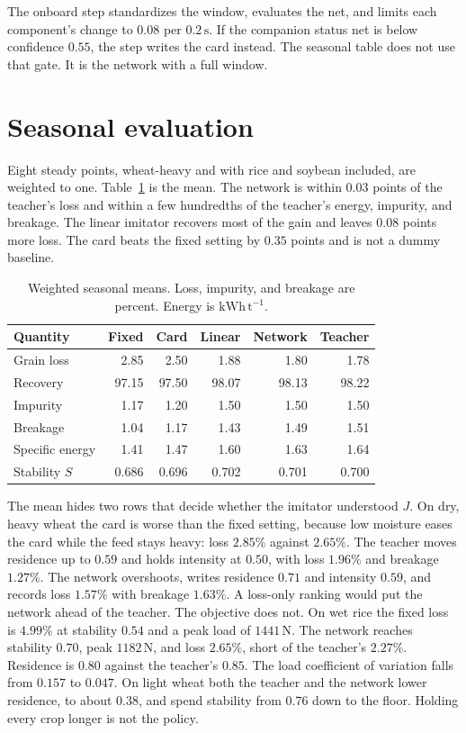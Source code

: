 \documentclass[11pt,a4paper]{article}
\begin{document}
The onboard step standardizes the window, evaluates the net, and limits each component's change to \(0.08\) per \(0.2\,\mathrm{s}\). If the companion status net is below confidence \(0.55\), the step writes the card instead. The seasonal table does not use that gate. It is the network with a full window.

\section{Seasonal evaluation}

Eight steady points, wheat-heavy and with rice and soybean included, are weighted to one. Table~\ref{tab:season} is the mean. The network is within \(0.03\) points of the teacher's loss and within a few hundredths of the teacher's energy, impurity, and breakage. The linear imitator recovers most of the gain and leaves \(0.08\) points more loss. The card beats the fixed setting by \(0.35\) points and is not a dummy baseline.

\begin{table}[ht]
\centering
\caption{Weighted seasonal means. Loss, impurity, and breakage are percent. Energy is \(\mathrm{kWh\,t^{-1}}\).}
\label{tab:season}
\begin{tabular}{@{}lrrrrr@{}}
\toprule
Quantity & Fixed & Card & Linear & Network & Teacher \\
\midrule
Grain loss & 2.85 & 2.50 & 1.88 & 1.80 & 1.78 \\
Recovery & 97.15 & 97.50 & 98.07 & 98.13 & 98.22 \\
Impurity & 1.17 & 1.20 & 1.50 & 1.50 & 1.50 \\
Breakage & 1.04 & 1.17 & 1.43 & 1.49 & 1.51 \\
Specific energy & 1.41 & 1.47 & 1.60 & 1.63 & 1.64 \\
Stability \(S\) & 0.686 & 0.696 & 0.702 & 0.701 & 0.700 \\
\bottomrule
\end{tabular}
\end{table}

The mean hides two rows that decide whether the imitator understood \(J\). On dry, heavy wheat the card is worse than the fixed setting, because low moisture eases the card while the feed stays heavy: loss \(2.85\%\) against \(2.65\%\). The teacher moves residence up to \(0.59\) and holds intensity at \(0.50\), with loss \(1.96\%\) and breakage \(1.27\%\). The network overshoots, writes residence \(0.71\) and intensity \(0.59\), and records loss \(1.57\%\) with breakage \(1.63\%\). A loss-only ranking would put the network ahead of the teacher. The objective does not. On wet rice the fixed loss is \(4.99\%\) at stability \(0.54\) and a peak load of \(1441\,\mathrm{N}\). The network reaches stability \(0.70\), peak \(1182\,\mathrm{N}\), and loss \(2.65\%\), short of the teacher's \(2.27\%\). Residence is \(0.80\) against the teacher's \(0.85\). The load coefficient of variation falls from \(0.157\) to \(0.047\). On light wheat both the teacher and the network lower residence, to about \(0.38\), and spend stability from \(0.76\) down to the floor. Holding every crop longer is not the policy.
\end{document}
